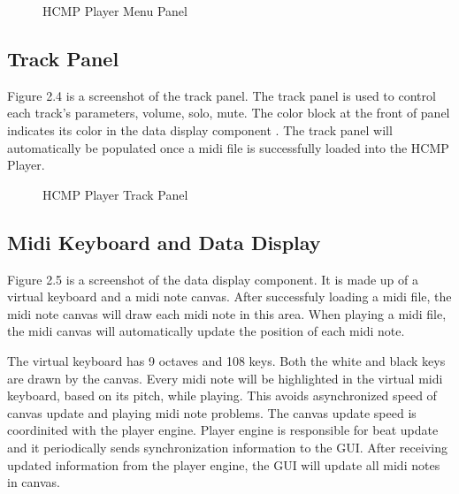 \begin{figure}[H]
\caption{HCMP Player Menu Panel}
\label{fig:speciation}
\end{figure}

\subsection{Track Panel}

Figure 2.4 is a screenshot of the track panel. The track panel is used to 
control each track's parameters, volume, solo, mute. The color
block at the front of panel indicates its color in the data display component . The 
track panel will automatically be populated once a midi file is successfully 
loaded into the HCMP Player.
\begin{figure}[H]
\caption{HCMP Player Track Panel}
\label{fig:speciation}
\end{figure}

\subsection{Midi Keyboard and Data Display}
Figure 2.5 is a screenshot of the data display component. It is made up of a virtual  
keyboard and a midi note canvas. After successfuly loading a midi file, the midi 
note canvas will 
draw each midi note in this area. When playing a midi file, the midi canvas will 
automatically update the position of each midi note. 

The virtual keyboard has 9 octaves and 108 keys. Both the white and black keys 
are drawn by the canvas. Every midi note will be highlighted in the 
virtual midi keyboard, based on its pitch, while playing. This avoids asynchronized speed 
of canvas update and playing midi note problems. The canvas update speed is 
coordinited with the player engine. Player engine is responsible for beat update and it 
periodically sends synchronization information to the GUI. After receiving updated 
information from the player engine, the GUI will update all midi notes in canvas.

